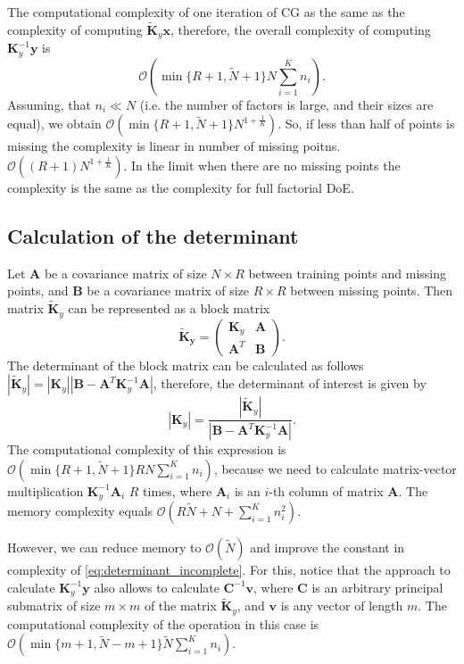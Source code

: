 The computational complexity of one iteration of CG as the same as the complexity
of computing $\mathbf{\widetilde{K}}_y \mathbf{x}$,
therefore, the overall complexity of computing $\mathbf{K}_y^{-1}\mathbf{y}$ is
\[
\mathcal{O}\left (\min\{R + 1, \widetilde{N} + 1\} N\sum_{i = 1}^K n_i \right ).
\]
Assuming,
that $n_i \ll N$ (i.e. the number of factors is large, and their sizes are equal),
we obtain
$\mathcal{O}(\min\{R + 1, \widetilde{N} + 1\} N^{1 + \frac{1}{K}})$.
So, if less than half of points is missing the complexity is linear in number of missing poitns.
$\mathcal{O}((R + 1)N^{1 + \frac{1}{K}})$.
In the limit when there are no missing points the complexity is the same
as the complexity for full factorial DoE.


\subsection{Calculation of the determinant}
Let $\mathbf{A}$ be a covariance matrix of size $N \times R$ between training points and
missing points,
and $\mathbf{B}$ be a covariance matrix of size $R \times R$ between missing points.
Then matrix $\mathbf{\widetilde{K}}_y$ can be represented as a block matrix
\[
\mathbf{\widetilde{K}_y} = \begin{pmatrix}
  \mathbf{K}_y & \mathbf{A} \\
  \mathbf{A}^T & \mathbf{B}
\end{pmatrix}.
\]
The determinant of the block matrix can be calculated as follows
$|\mathbf{\widetilde{K}}_y | = |\mathbf{K}_y| |\mathbf{B} - \mathbf{A}^T \mathbf{K}_y^{-1}\mathbf{A}|$,
therefore, the determinant of interest is given by
\begin{equation}
\label{eq:determinant_incomplete}
|\mathbf{K}_y| = \frac{|\mathbf{\widetilde{K}}_y |}{|\mathbf{B} - \mathbf{A}^T \mathbf{K}_y^{-1}\mathbf{A}|}.
\end{equation}
The computational complexity of this expression is
$\mathcal{O}(\min\{R + 1, \widetilde{N} + 1\} R N\sum_{i = 1}^K n_i)$,
because we need to calculate matrix-vector multiplication $\mathbf{K}_y^{-1}\mathbf{A}_i$
$R$ times,
where $\mathbf{A}_i$ is an $i$-th column of matrix $\mathbf{A}$.
The memory complexity equals $\mathcal{O}(R\widetilde{N} + N + \sum_{i = 1}^K n_i^2)$.

However, we can reduce memory to $\mathcal{O}(\widetilde{N})$ and improve the constant in complexity of
\eqref{eq:determinant_incomplete}.
For this, notice that the approach to calculate $\mathbf{K}_y^{-1}\mathbf{y}$
also allows to calculate $\mathbf{C}^{-1}\mathbf{v}$,
where $\mathbf{C}$ is an arbitrary principal submatrix of size $m \times m$
of the matrix $\mathbf{\widetilde{K}}_y$,
and $\mathbf{v}$ is any vector of length $m$.
The computational complexity of the operation in this case is
$\mathcal{O} \left (\min\{m + 1, \widetilde{N} - m + 1\}
\widetilde{N}\sum_{i = 1}^K n_i \right )$.

